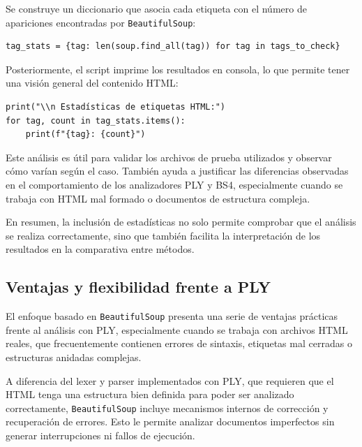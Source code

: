 \documentclass[11pt,a4paper]{article}
\begin{document}
Se construye un diccionario que asocia cada etiqueta con el número de apariciones encontradas por \texttt{BeautifulSoup}:

\begin{verbatim}
tag_stats = {tag: len(soup.find_all(tag)) for tag in tags_to_check}
\end{verbatim}

Posteriormente, el script imprime los resultados en consola, lo que permite tener una visión general del contenido HTML:

\begin{verbatim}
print("\\n Estadísticas de etiquetas HTML:")
for tag, count in tag_stats.items():
    print(f"{tag}: {count}")
\end{verbatim}

\medskip

Este análisis es útil para validar los archivos de prueba utilizados y observar cómo varían según el caso. También ayuda a justificar las diferencias observadas en el comportamiento de los analizadores PLY y BS4, especialmente cuando se trabaja con HTML mal formado o documentos de estructura compleja.

\medskip

En resumen, la inclusión de estadísticas no solo permite comprobar que el análisis se realiza correctamente, sino que también facilita la interpretación de los resultados en la comparativa entre métodos.

\subsection{Ventajas y flexibilidad frente a PLY}

El enfoque basado en \texttt{BeautifulSoup} presenta una serie de ventajas prácticas frente al análisis con PLY, especialmente cuando se trabaja con archivos HTML reales, que frecuentemente contienen errores de sintaxis, etiquetas mal cerradas o estructuras anidadas complejas.

\medskip

A diferencia del lexer y parser implementados con PLY, que requieren que el HTML tenga una estructura bien definida para poder ser analizado correctamente, \texttt{BeautifulSoup} incluye mecanismos internos de corrección y recuperación de errores. Esto le permite analizar documentos imperfectos sin generar interrupciones ni fallos de ejecución.
\end{document}
